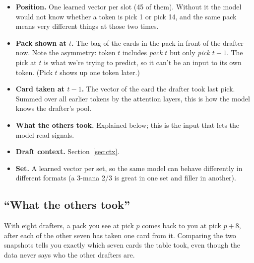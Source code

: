 \documentclass[11pt,letterpaper]{article}
\begin{document}
\begin{itemize}
\item \textbf{Position.} One learned vector per slot (45 of them). Without it the model would not know
whether a token is pick 1 or pick 14, and the same pack means very different things at those two times.
\item \textbf{Pack shown at $t$.} The bag of the cards in the pack in front of the drafter now. Note the
asymmetry: token $t$ includes \emph{pack $t$} but only \emph{pick $t-1$}. The pick at $t$ is what we're
trying to predict, so it can't be an input to its own token. (Pick $t$ shows up one token later.)
\item \textbf{Card taken at $t-1$.} The vector of the card the drafter took last pick. Summed over all
earlier tokens by the attention layers, this is how the model knows the drafter's pool.
\item \textbf{What the others took.} Explained below; this is the input that lets the model read signals.
\item \textbf{Draft context.} Section~\ref{sec:ctx}.
\item \textbf{Set.} A learned vector per set, so the same model can behave differently in different
formats (a 3-mana 2/3 is great in one set and filler in another).
\end{itemize}

\subsection{``What the others took''}

With eight drafters, a pack you see at pick $p$ comes back to you at pick $p+8$, after each of the other
seven has taken one card from it. Comparing the two snapshots tells you exactly which seven cards the
table took, even though the data never says who the other drafters are.
\end{document}
